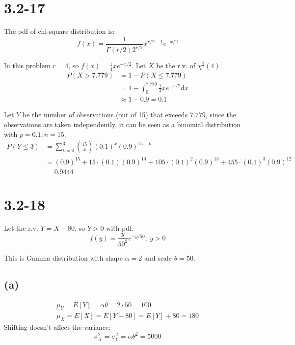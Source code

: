 \documentclass[12pt]{article}
\title{\mytitle}
\author{\myauthor}
\date{\today}
\theoremstyle{definition}
\theoremstyle{remark}
\begin{document}
\maketitle

\section*{3.2-17}
The pdf of chi-square distribution is:
$$f(x)=\frac{1}{\varGamma(r/2)2^{r/2}}x^{r/2-1}e^{-x/2}$$

In this problem $r=4$, so $f(x)=\frac{1}{4}xe^{-x/2}$. Let $X$ be the r.v. of $\chi^2(4)$.
\begin{align*}
    P(X>7.779)&=1-P(X\le 7.779) \\
    &=1-\int_{0}^{7.779}\frac{1}{4}xe^{-x/2}\mathrm{d}x \\
    &\approx 1-0.9=0.1
\end{align*}

Let $Y$ be the number of observations (out of 15) that exceeds $7.779$, since the observations are taken independently, it can be seen as a binomial distribution with $p=0.1, n=15$.
\begin{align*}
    P(Y\le 3)&=\sum^3_{k=0}\binom{15}{k}(0.1)^{k}(0.9)^{15-k} \\
    &=(0.9)^{15}+15\cdot (0.1)(0.9)^{14}+105\cdot (0.1)^2(0.9)^{13}+455\cdot (0.1)^3(0.9)^{12} \\
    &= 0.9444
\end{align*}



\newpage{}
\section*{3.2-18}
Let the r.v. $Y=X-80$, so $Y>0$ with pdf:
$$f(y)=\frac{y}{50^2}e^{-y/50},\ y>0$$

This is Gamma distribution with shape $\alpha=2$ and scale $\theta=50$.
\subsection*{(a)}
\begin{align*}
    \mu_{Y}=E[Y]=\alpha\theta=2\cdot 50=100 \\
    \mu_{X}=E[X]=E[Y+80]=E[Y]+80=180
\end{align*}
Shifting doesn't affect the variance:
$$\sigma^2_{X}=\sigma^2_{Y}=\alpha\theta^2=5000$$
\end{document}
